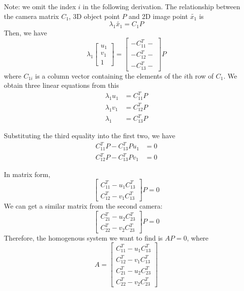 \documentclass{article} %
\begin{document}
    Note: we omit the index $i$ in the following derivation.
    \smallskip
    The relationship between the camera matrix $C_{1}$, 3D object point $P$ and 2D image point $\widetilde{x_{1}}$ is
    \begin{equation*}
    \lambda _{1}\widetilde{x_{1}}=C_{1}P
    \end{equation*}
    Then, we have
    \begin{equation*}
    \lambda _{1}\left[\begin{array}{c}
    u_{1}\\
    v_{1}\\
    1
    \end{array}\right]=\left[\begin{array}{c}
    -{C}_{11}^{T}-\\
    -{C}_{12}^{T}-\\
    -{C}_{13}^{T}-
    \end{array}\right]P
    \end{equation*}
    where $C_{1i}$ is a column vector containing the elements of the $i$th row of $C_{1}$. We obtain three linear equations from this
    \begin{align*}
    \lambda _{1}u_{1}&={C}_{11}^{T}P \\
    \lambda _{1}v_{1}&={C}_{12}^{T}P \\
    \lambda _{1}&={C}_{13}^{T}P 
    \end{align*}

    Substituting the third equality into the first two, we have
    \begin{align*}
    {C}_{11}^{T}P-{C}_{13}^{T}Pu_{1}&=0 \\
    {C}_{12}^{T}P-{C}_{13}^{T}Pv_{1}&=0 
    \end{align*}

    In matrix form,
    \begin{equation*}
    \left[\begin{array}{c}
    {C}_{11}^{T}-u_{1}{C}_{13}^{T}\\
    {C}_{12}^{T}-v_{1}{C}_{13}^{T}
    \end{array}\right]P=0
    \end{equation*}
    We can get a similar matrix from the second camera:
    \begin{equation*}
    \left[\begin{array}{c}
    {C}_{21}^{T}-u_{2}{C}_{23}^{T}\\
    {C}_{22}^{T}-v_{2}{C}_{23}^{T}
    \end{array}\right]P=0
    \end{equation*}
    Therefore, the homogenous system we want to find is $AP=0$, where
    \begin{equation*}
    A=\left[\begin{array}{c}
    {C}_{11}^{T}-u_{1}{C}_{13}^{T}\\
    {C}_{12}^{T}-v_{1}{C}_{13}^{T}\\
    {C}_{21}^{T}-u_{2}{C}_{23}^{T}\\
    {C}_{22}^{T}-v_{2}{C}_{23}^{T}
    \end{array}\right]
    \end{equation*}
\end{document}
